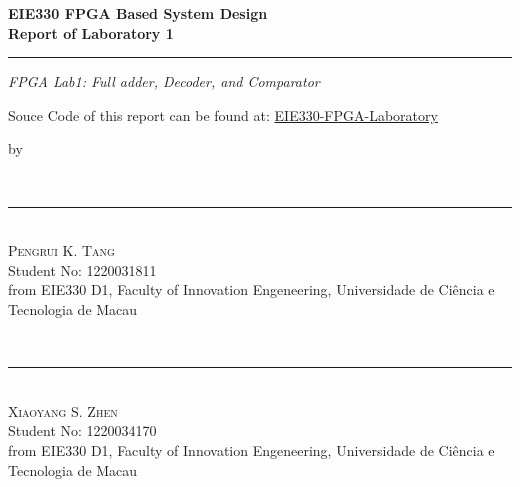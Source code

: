 \documentclass[a4paper,11pt]{article}
\begin{document}
\begin{titlepage}
    \ActivateWarningFilters[latex]

    \parbox{1\textwidth}{ %
        {\Large\bfseries EIE330 FPGA Based System Design}\\[0.5\baselineskip] %
        {\Huge\bfseries Report of Laboratory 1}\\[0.15\baselineskip] %
		\rule{1\textwidth}{1pt} %
        {\Large\textit{FPGA Lab1: Full adder, Decoder, and Comparator}}
    }
    \parbox{1\textwidth}{
        \vspace{1\baselineskip}
        \large
        Souce Code of this report can be found at:
        \href{https://github.com/ZeppelinSCB/EIE330-FPGA-Laboratory}
            {EIE330-FPGA-Laboratory}
    }
    \parbox{1\textwidth}{
        \vspace{1\baselineskip}
        \large by
    }
    \parbox{1\textwidth}{
        {~\\[1.7\baselineskip]}
        {\rule[1pt]{200pt}{1pt}} \\[1.25pt]
        {\huge\textsc{Pengrui K. Tang}
        }\\
        {\large{Student No: 1220031811}} \\
        \large from EIE330 D1, \newline
        Faculty of Innovation Engeneering, \newline
        Universidade de Ciência e Tecnologia de Macau
    }
    \parbox{1\textwidth}{
        {~\\[1.7\baselineskip]}
        {\rule[1pt]{200pt}{1pt}} \\[1.25pt]
        {\huge\textsc{Xiaoyang S. Zhen}
            }\\
        {\large{Student No: 1220034170}} \\
        \large from EIE330 D1, \newline
        Faculty of Innovation Engeneering, \newline
        Universidade de Ciência e Tecnologia de Macau
    }
	\FloatBarrier


\end{titlepage}
\end{document}
